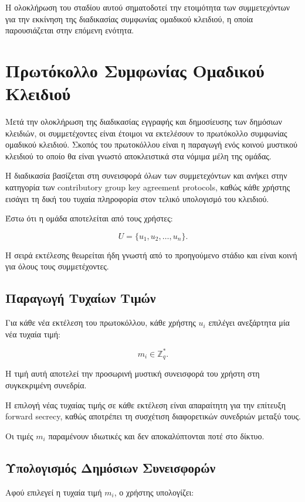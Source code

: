 \documentclass[12pt,a4paper]{report}
\begin{document}
Η ολοκλήρωση του σταδίου αυτού σηματοδοτεί την ετοιμότητα των συμμετεχόντων για την εκκίνηση της διαδικασίας συμφωνίας ομαδικού κλειδιού, η οποία παρουσιάζεται στην επόμενη ενότητα.

\section{Πρωτόκολλο Συμφωνίας Ομαδικού Κλειδιού}

Μετά την ολοκλήρωση της διαδικασίας εγγραφής και δημοσίευσης των δημόσιων κλειδιών, οι συμμετέχοντες είναι έτοιμοι να εκτελέσουν το πρωτόκολλο συμφωνίας ομαδικού κλειδιού. Σκοπός του πρωτοκόλλου είναι η παραγωγή ενός κοινού μυστικού κλειδιού το οποίο θα είναι γνωστό αποκλειστικά στα νόμιμα μέλη της ομάδας.

Η διαδικασία βασίζεται στη συνεισφορά όλων των συμμετεχόντων και ανήκει στην κατηγορία των contributory group key agreement protocols, καθώς κάθε χρήστης εισάγει τη δική του τυχαία πληροφορία στον τελικό υπολογισμό του κλειδιού.

Έστω ότι η ομάδα αποτελείται από τους χρήστες:

\[
U = \{u_1,u_2,\ldots,u_n\}.
\]

Η σειρά εκτέλεσης θεωρείται ήδη γνωστή από το προηγούμενο στάδιο και είναι κοινή για όλους τους συμμετέχοντες.

\subsection{Παραγωγή Τυχαίων Τιμών}

Για κάθε νέα εκτέλεση του πρωτοκόλλου, κάθε χρήστης $u_i$ επιλέγει ανεξάρτητα μία νέα τυχαία τιμή:

\[
m_i \in \mathbb{Z}_q^{*}.
\]

Η τιμή αυτή αποτελεί την προσωρινή μυστική συνεισφορά του χρήστη στη συγκεκριμένη συνεδρία.

Η επιλογή νέας τυχαίας τιμής σε κάθε εκτέλεση είναι απαραίτητη για την επίτευξη forward secrecy, καθώς αποτρέπει τη συσχέτιση διαφορετικών συνεδριών μεταξύ τους.

Οι τιμές $m_i$ παραμένουν ιδιωτικές και δεν αποκαλύπτονται ποτέ στο δίκτυο.

\subsection{Υπολογισμός Δημόσιων Συνεισφορών}

Αφού επιλεγεί η τυχαία τιμή $m_i$, ο χρήστης υπολογίζει:
\end{document}
